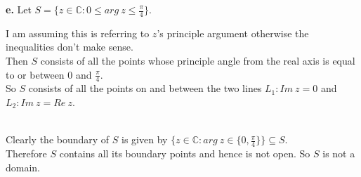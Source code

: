 \documentclass{article}
\begin{document}
{\Large\textbf{e.}} Let $S =\{z\in\mathbb{C}: 0\leq arg\:z\leq\frac{\pi}{4}\}$.
\begin{center}
    \doublespacing
    I am assuming this is referring to $z$'s principle argument otherwise the inequalities don't make sense.
    \\Then $S$ consists of all the points whose principle angle from the real axis is equal to or between 0 and $\frac{\pi}{4}$.
    \\So $S$ consists of all the points on and between the two lines $L_1: Im\:z = 0$ and $L_2: Im\:z = Re\:z$.
    \break
    \\Clearly the boundary of $S$ is given by $\{z\in\mathbb{C}: arg\:z\in\{0,\frac{\pi}{4}\}\}\subseteq S$.
    \\Therefore $S$ contains all its boundary points and hence is not open. So $S$ is not a domain.
\end{center}
\end{document}
